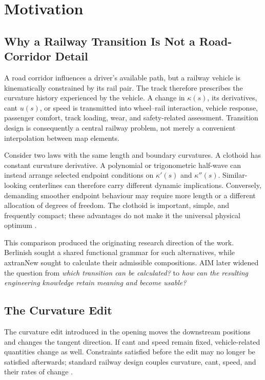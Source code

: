 
\chapter{Motivation}

\section{Why a Railway Transition Is Not a Road-Corridor Detail}

A road corridor influences a driver's available path, but a railway vehicle is
kinematically constrained by its rail pair. The track therefore prescribes the
curvature history experienced by the vehicle. A change in
\(\kappa(s)\), its derivatives, cant \(u(s)\), or speed is transmitted into
wheel--rail interaction, vehicle response, passenger comfort, track loading,
wear, and safety-related assessment. Transition design is consequently a
central railway problem, not merely a convenient interpolation between map
elements.

Consider two laws with the same length and boundary curvatures. A clothoid has
constant curvature derivative. A polynomial or trigonometric half-wave can
instead arrange selected endpoint conditions on
\(\kappa'(s)\) and \(\kappa''(s)\). Similar-looking centerlines can therefore
carry different dynamic implications. Conversely, demanding smoother endpoint
behaviour may require more length or a different allocation of degrees of
freedom. The clothoid is important, simple, and frequently compact; these
advantages do not make it the universal physical optimum
\cite{BrustadDalmo2020Review,Koc2017SmoothedEnds}.

This comparison produced the originating research direction of the work.
Berlinish sought a shared functional grammar for such alternatives, while
axtranNew sought to calculate their admissible compositions. AIM later widened
the question from \emph{which transition can be calculated?} to \emph{how can
the resulting engineering knowledge retain meaning and become usable?}

\section{The Curvature Edit}

The curvature edit introduced in the opening moves the downstream positions and
changes the tangent direction. If cant and speed remain fixed, vehicle-related
quantities change as well. Constraints satisfied before the edit may no longer
be satisfied afterwards; standard railway design couples curvature, cant,
speed, and their rates of change \cite{EN13803_2017,Klein1998Trassierung}.


